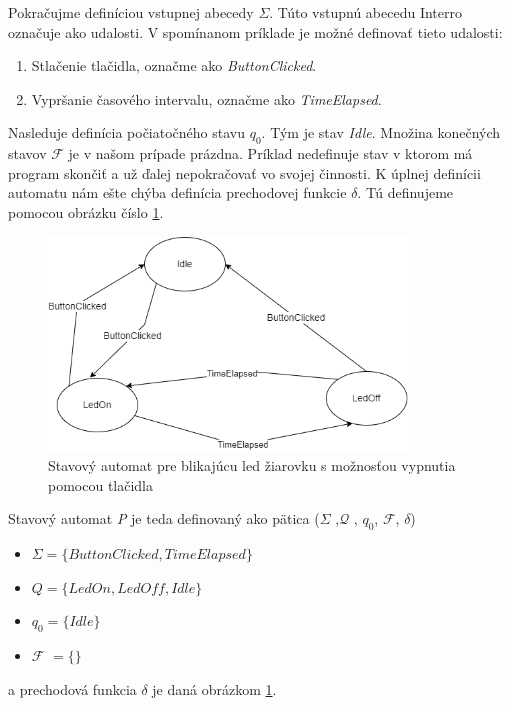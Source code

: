 Pokračujme definíciou vstupnej abecedy $\Sigma$. Túto vstupnú abecedu Interro označuje ako udalosti. V spomínanom príklade je možné definovať tieto udalosti:
\begin{enumerate}
    \item Stlačenie tlačidla, označme ako \textit{ButtonClicked}.
    \item Vypršanie časového intervalu, označme ako \textit{TimeElapsed}.
\end{enumerate}

Nasleduje definícia počiatočného stavu $q_0$. Tým je stav \textit{Idle}. Množina konečných stavov $\mathcal{F}$ je v našom prípade prázdna. Príklad nedefinuje
stav v ktorom má program skončiť a už ďalej nepokračovať vo svojej činnosti. K úplnej definícii automatu nám ešte chýba definícia prechodovej funkcie $\delta$.
Tú definujeme pomocou obrázku číslo \ref{figure:blinking-led-state-machine}.

\begin{figure}[!h]
    \centering
    \includegraphics[width=0.85\textwidth]{img/blinking-led-state-machine.png}
    \caption{Stavový automat pre blikajúcu led žiarovku s možnosťou vypnutia pomocou tlačidla}
    \label{figure:blinking-led-state-machine}
\end{figure}

Stavový automat \textit{P} je teda definovaný ako pätica ($\Sigma$ ,$\mathcal{Q}$ , $q_0$, $\mathcal{F}$, $\delta$)
\begin{itemize}
    \item \begin{math} \Sigma = \{ \textit{ButtonClicked}, \textit{TimeElapsed} \}  \end{math}
    \item \begin{math} Q = \{ \textit{LedOn}, \textit{LedOff}, \textit{Idle} \}  \end{math}
    \item \begin{math} q_0 = \{ \textit{Idle} \}  \end{math}
    \item $\mathcal{F}$ \begin{math} = \{ \}  \end{math}
\end{itemize}
a prechodová funkcia $\delta$ je daná obrázkom \ref{figure:blinking-led-state-machine}.

